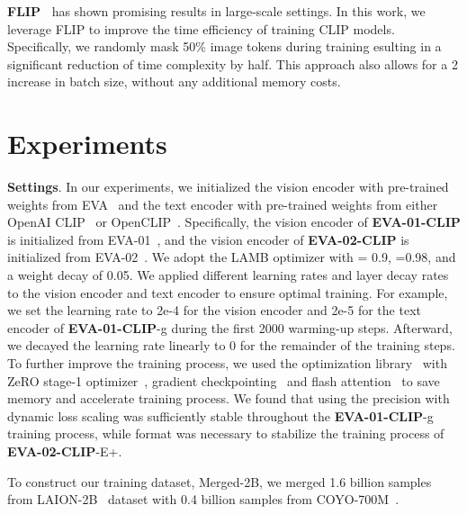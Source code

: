 \documentclass[10pt,twocolumn,letterpaper]{article}
\newcommand{\evablue}[1]{\textcolor{00blue!80}{#1}}
\renewcommand{\paragraph}[1]{\vspace{1.25mm}\noindent\textbf{#1}}
\newcommand{\evaOneclip}{{\textbf{\evablue{EVA-01-CLIP}}}\xspace}
\newcommand{\evaTwoclip}{{\textbf{\evablue{EVA-02-CLIP}}}\xspace}
\begin{document}
\paragraph{FLIP~\cite{flip}} has shown promising results in large-scale settings. In this work, we leverage FLIP to improve the time efficiency of training CLIP models. Specifically, we randomly mask 50\% image tokens during training esulting in a significant reduction of time complexity by half. This approach also allows for a 2 increase in batch size, without any additional memory costs.


\section{Experiments}
\paragraph{Settings}. In our experiments, we initialized the vision encoder with pre-trained weights from EVA~\cite{eva, EVA02} and the text encoder with pre-trained weights from either OpenAI CLIP~\cite{clip} or OpenCLIP~\cite{openclip}. 
Specifically, the vision encoder of \evaOneclip is initialized from EVA-01~\cite{eva}, and the vision encoder of \evaTwoclip is initialized from EVA-02~\cite{EVA02}.
We adopt the LAMB optimizer with  = 0.9, =0.98, and a weight decay of 0.05. We applied different learning rates and layer decay rates to the vision encoder and text encoder to ensure optimal training. For example, we set the learning rate to 2e-4 for the vision encoder and 2e-5 for the text encoder of \evaOneclip-g during the first 2000 warming-up steps. Afterward, we decayed the learning rate linearly to 0 for the remainder of the training steps. To further improve the training process, we used the  optimization library~\cite{rasley2020deepspeed} with ZeRO stage-1 optimizer~\cite{rajbhandari2020zero}, gradient checkpointing~\cite{gradcheckpointing} and flash attention~\cite{flashattention} to save memory and accelerate training process. We found that using the  precision with dynamic loss scaling was sufficiently stable throughout the \evaOneclip-g training process, while  format was necessary to stabilize the training process of \evaTwoclip-E+.

To construct our training dataset, Merged-2B, we merged 1.6 billion samples from LAION-2B~\cite{laion5b} dataset with 0.4 billion samples from COYO-700M~\cite{kakaobrain2022coyo-700m}.
\end{document}
